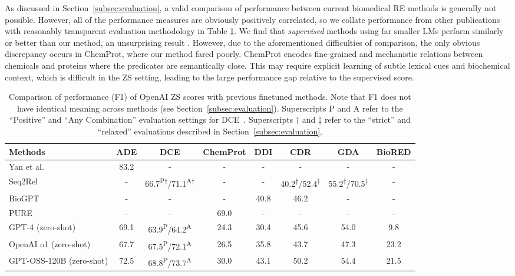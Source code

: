 \documentclass[11pt]{article}
\begin{document}
As discussed in Section~\ref{subsec:evaluation}, a valid comparison of performance between current biomedical RE methods is generally not possible. However, all of the performance measures are obviously positively correlated, so we collate performance from other publications with reasonably transparent evaluation methodology in Table \ref{table:SOTA}. We find that \textit{supervised} methods using far smaller LMs perform similarly or better than our method, an unsurprising result \cite{wadhwa-etal-2023-revisiting}.  However, due to the aforementioned difficulties of comparison, the only obvious discrepancy occurs in ChemProt, where our method fared poorly. 
ChemProt encodes fine-grained and mechanistic relations between chemicals and proteins where the predicates are semantically close. This may require explicit learning of subtle lexical cues and biochemical context, which is difficult in the ZS setting, leading to the large performance gap relative to the supervised score.

\begin{table}[htbp]
\centering
\small
\renewcommand{\arraystretch}{1.3}
\begin{tabular}{lccccccc}
\toprule
\textbf{Methods} & ADE & DCE  & ChemProt & DDI & CDR & GDA & BioRED \\
\midrule
Yan et al. \cite{yan2021partition} & 83.2 &  - & -  & - & - & - & -\\
Seq2Rel \cite{giorgi-etal-2022-sequence} & - & 66.7\textsuperscript{P$\dagger$}/71.1\textsuperscript{A$\dagger$} & - & - & 40.2\textsuperscript{$\dagger$}/52.4\textsuperscript{$\ddagger$}& 55.2\textsuperscript{$\dagger$}/70.5\textsuperscript{$\ddagger$} & - \\
BioGPT \cite{luo2022biogpt} & - & - & - & 40.8 & 46.2 & - & - \\
PURE \cite{zhong-chen-2021-frustratingly} &  - & - & 69.0  & - & - & - & -\\
\midrule
GPT-4 (zero-shot) & 69.1& 63.9\textsuperscript{P}/64.2\textsuperscript{A} & 24.3 & 30.4 & 45.6 & 54.0 & 9.8 \\
OpenAI o1 (zero-shot) & 67.7& 67.5\textsuperscript{P}/72.1\textsuperscript{A} & 26.5 & 35.8 & 43.7 & 47.3 & 23.2 \\
GPT-OSS-120B (zero-shot) & 72.5 & 68.8\textsuperscript{P}/73.7\textsuperscript{A} & 30.0 & 43.1 & 50.2 & 54.4 & 21.5 \\
\bottomrule
\end{tabular}
\caption{\label{table:SOTA} Comparison of performance (F1) of OpenAI ZS scores  with previous finetuned methods.  Note that F1 does not have identical meaning across methods (see Section~\ref{subsec:evaluation}). %
Superscripts P and A refer to the ``Positive'' and ``Any Combination'' evaluation settings for DCE~\cite{jiang2023end}. Superscripts $\dagger$ and $\ddagger$ refer to the ``strict'' and ``relaxed'' evaluations described in Section~\ref{subsec:evaluation}.}
\end{table}
\end{document}
